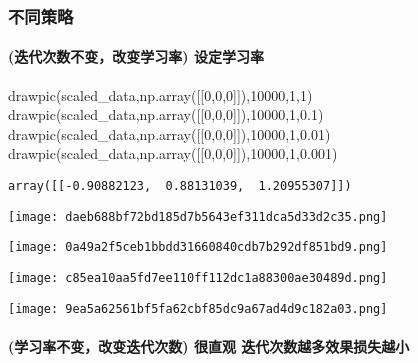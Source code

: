\documentclass[
]{article}
\newenvironment{Shaded}{}{}
\newcommand{\DecValTok}[1]{\textcolor[rgb]{0.25,0.63,0.44}{#1}}
\newcommand{\FloatTok}[1]{\textcolor[rgb]{0.25,0.63,0.44}{#1}}
\newcommand{\NormalTok}[1]{#1}
\begin{document}
\hypertarget{ux4e0dux540cux7b56ux7565}{%
\subsubsection{不同策略}\label{ux4e0dux540cux7b56ux7565}}

\hypertarget{ux8fedux4ee3ux6b21ux6570ux4e0dux53d8ux6539ux53d8ux5b66ux4e60ux7387-ux8bbeux5b9aux5b66ux4e60ux7387}{%
\paragraph{(迭代次数不变，改变学习率)
设定学习率}\label{ux8fedux4ee3ux6b21ux6570ux4e0dux53d8ux6539ux53d8ux5b66ux4e60ux7387-ux8bbeux5b9aux5b66ux4e60ux7387}}

\begin{Shaded}
\begin{Highlighting}[]
\NormalTok{drawpic(scaled\_data,np.array([[}\DecValTok{0}\NormalTok{,}\DecValTok{0}\NormalTok{,}\DecValTok{0}\NormalTok{]]),}\DecValTok{10000}\NormalTok{,}\DecValTok{1}\NormalTok{,}\DecValTok{1}\NormalTok{)}
\NormalTok{drawpic(scaled\_data,np.array([[}\DecValTok{0}\NormalTok{,}\DecValTok{0}\NormalTok{,}\DecValTok{0}\NormalTok{]]),}\DecValTok{10000}\NormalTok{,}\DecValTok{1}\NormalTok{,}\FloatTok{0.1}\NormalTok{)}
\NormalTok{drawpic(scaled\_data,np.array([[}\DecValTok{0}\NormalTok{,}\DecValTok{0}\NormalTok{,}\DecValTok{0}\NormalTok{]]),}\DecValTok{10000}\NormalTok{,}\DecValTok{1}\NormalTok{,}\FloatTok{0.01}\NormalTok{)}
\NormalTok{drawpic(scaled\_data,np.array([[}\DecValTok{0}\NormalTok{,}\DecValTok{0}\NormalTok{,}\DecValTok{0}\NormalTok{]]),}\DecValTok{10000}\NormalTok{,}\DecValTok{1}\NormalTok{,}\FloatTok{0.001}\NormalTok{)}
\end{Highlighting}
\end{Shaded}

\begin{verbatim}
array([[-0.90882123,  0.88131039,  1.20955307]])
\end{verbatim}

\texttt{[image: daeb688bf72bd185d7b5643ef311dca5d33d2c35.png]}

\texttt{[image: 0a49a2f5ceb1bbdd31660840cdb7b292df851bd9.png]}

\texttt{[image: c85ea10aa5fd7ee110ff112dc1a88300ae30489d.png]}

\texttt{[image: 9ea5a62561bf5fa62cbf85dc9a67ad4d9c182a03.png]}

\hypertarget{ux5b66ux4e60ux7387ux4e0dux53d8ux6539ux53d8ux8fedux4ee3ux6b21ux6570-ux5f88ux76f4ux89c2-ux8fedux4ee3ux6b21ux6570ux8d8aux591aux6548ux679cux635fux5931ux8d8aux5c0f}{%
\paragraph{(学习率不变，改变迭代次数) 很直观
迭代次数越多效果损失越小}\label{ux5b66ux4e60ux7387ux4e0dux53d8ux6539ux53d8ux8fedux4ee3ux6b21ux6570-ux5f88ux76f4ux89c2-ux8fedux4ee3ux6b21ux6570ux8d8aux591aux6548ux679cux635fux5931ux8d8aux5c0f}}
\end{document}
